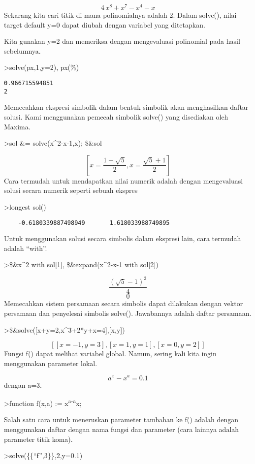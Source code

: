 \documentclass[
]{book}
\begin{document}
\[4\,x^8+x^7-x^4-x\]Sekarang kita cari titik di mana polinomialnya adalah 2. Dalam solve(), nilai target default y=0 dapat diubah dengan variabel yang ditetapkan.

Kita gunakan y=2 dan memeriksa dengan mengevaluasi polinomial pada hasil sebelumnya.

\textgreater solve(px,1,y=2), px(\%)

\begin{verbatim}
0.966715594851
2
\end{verbatim}

Memecahkan ekspresi simbolik dalam bentuk simbolik akan menghasilkan daftar solusi. Kami menggunakan pemecah simbolik solve() yang disediakan oleh Maxima.

\textgreater sol \&= solve(x\^{}2-x-1,x); \$\&sol

\[\left[ x=\frac{1-\sqrt{5}}{2} , x=\frac{\sqrt{5}+1}{2} \right]\]Cara termudah untuk mendapatkan nilai numerik adalah dengan mengevaluasi solusi secara numerik seperti sebuah ekspres

\textgreater longest sol()

\begin{verbatim}
    -0.6180339887498949       1.618033988749895 
\end{verbatim}

Untuk menggunakan solusi secara simbolis dalam ekspresi lain, cara termudah adalah ``with''.

\textgreater\$\&x\^{}2 with sol{[}1{]}, \$\&expand(x\^{}2-x-1 with sol{[}2{]})

\[\frac{\left(\sqrt{5}-1\right)^2}{4}\] \[0\]Memecahkan sistem persamaan secara simbolis dapat dilakukan dengan vektor persamaan dan penyelesai simbolis solve(). Jawabannya adalah daftar persamaan.

\textgreater\$\&solve({[}x+y=2,x\^{}3+2*y+x=4{]},{[}x,y{]})

\[\left[ \left[ x=-1 , y=3 \right]  , \left[ x=1 , y=1 \right]  , \left[ x=0 , y=2 \right]  \right]\]Fungsi f() dapat melihat variabel global. Namun, sering kali kita ingin menggunakan parameter lokal.

\[a^x-x^a = 0.1\]dengan a=3.

\textgreater function f(x,a) := x\textsuperscript{a-a}x;

Salah satu cara untuk meneruskan parameter tambahan ke f() adalah dengan menggunakan daftar dengan nama fungsi dan parameter (cara lainnya adalah parameter titik koma).

\textgreater solve(\{\{``f'',3\}\},2,y=0.1)
\end{document}
